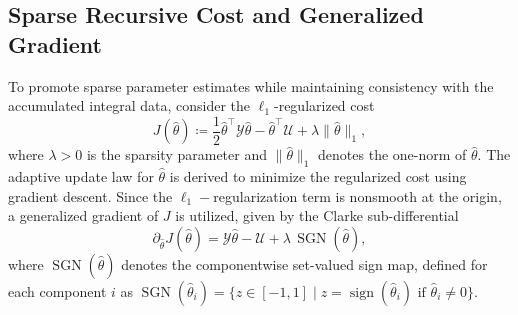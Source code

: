 \documentclass[conference]{ieeeconf}
\newcommand{\SGN}{\operatorname{SGN}}
\begin{document}
\subsection{Sparse Recursive Cost and Generalized Gradient}
\label{subsec:sparse_cost}

To promote sparse parameter estimates while maintaining consistency with the accumulated integral data, consider the $\ell_{1}$-regularized cost
\begin{equation}\label{eq:J}
J(\hat{\theta}) \coloneqq 
\frac{1}{2} \hat{\theta}^\top \mathcal{Y} \hat{\theta} 
- \hat{\theta}^\top \mathcal{U} 
+ \lambda \|\hat{\theta}\|_1,
\end{equation}
where $\lambda>0$ is the sparsity parameter and $\|\hat{\theta}\|_1$ denotes the one-norm of $\hat{\theta}$. The adaptive update law for $\hat{\theta}$ is derived to minimize the regularized cost using gradient descent. Since the $\ell_1-$regularization term is nonsmooth at the origin, a generalized gradient of $J$ is utilized, given by the Clarke sub-differential \cite{SCC.Clarke1975}
\begin{equation}\label{eq:partial_J}
    \partial_{\hat\theta}J(\hat\theta) =  \mathcal{Y}\hat\theta-\mathcal{U}+\lambda\,\SGN(\hat\theta),
\end{equation}
where $\SGN(\hat{\theta})$ denotes the componentwise set-valued sign map, defined for each component $i$ as $\SGN(\hat{\theta}_i) = \big\{ z \in [-1,1] \mid z = \operatorname{sign}(\hat{\theta}_i) \text{ if } \hat{\theta}_i \neq 0 \big\}$.
\end{document}
